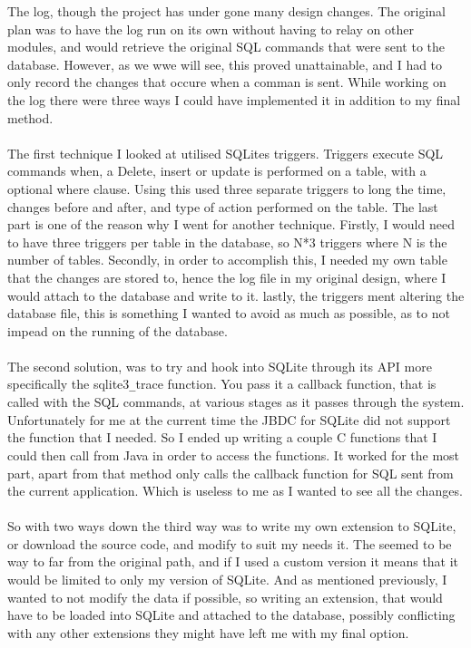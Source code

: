 The log, though the project has under gone many design changes. The original plan was to have the log run on its own without having to relay on other modules, and would retrieve the original SQL commands that were sent to the database. However, as we wwe will see, this proved unattainable, and I had to only record the changes that occure when a comman is sent. While working on the log there were three ways I could have implemented it in addition to my final method.
\\\\
The first technique I looked at utilised SQLites triggers. Triggers execute SQL commands when, a Delete, insert or update is performed on a table, with a optional where clause. Using this \cite{sqlitetriggers} used three separate triggers to long the time, changes before and after, and type of action performed on the table. The last part is one of the reason why I went for another technique. Firstly, I would need to have three triggers per table in the database, so N*3 triggers where N is the number of tables. Secondly, in order to accomplish this, I needed my own table that the changes are stored to, hence the log file in my original design, where I would attach to the database and write to it. lastly, the triggers ment altering the database file, this is something I wanted to avoid as much as possible, as to not impead on the running of the database.  
\\\\
The second solution, was to try and hook into SQLite through its API more specifically the sqlite3\verb|_|trace function. You pass it a callback function, that is called with the SQL commands, at various stages as it passes through the system. Unfortunately for me at the current time the JBDC for SQLite did not support the function that I needed. So I ended up writing a couple C functions that I could then call from Java in order to access the functions. It worked for the most part, apart from that method only calls the callback function for SQL sent from the current application. Which is useless to me as I wanted to see all the changes. 
\\\\
So with two ways down the third way was to write my own extension to SQLite, or download the source code, and modify to suit my needs it. The seemed to be way to far from the original path, and if I used a custom version it means that it would be limited to only my version of SQLite. And as mentioned previously, I wanted to not modify the data if possible, so writing an extension, that would have to be loaded into SQLite and attached to the database, possibly conflicting with any other extensions they might have left me with my final option.

